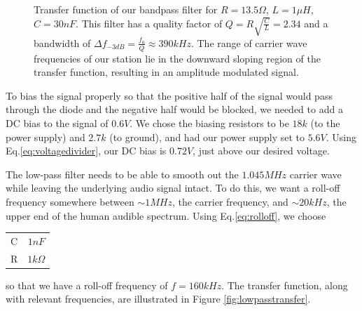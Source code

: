 \documentclass[12pt]{article}
\begin{document}
\begin{figure}[H]
\caption{Transfer function of our bandpass filter for $R =13.5\Omega$, $L=1\mu H$, $C=30nF$. This filter has a quality factor of $Q=R\sqrt{\frac{C}{L}}=2.34$ and a bandwidth of $\Delta f_{-3dB}=\frac{f_0}{Q}\approx 390kHz$. The range of carrier wave frequencies of our station lie in the downward sloping region of the transfer function, resulting in an amplitude modulated signal.}
\label{fig:bandpasstransfer}
\end{figure}

To bias the signal properly so that the positive half of the signal would pass through the diode and the negative half would be blocked, we needed to add a DC bias to the signal of $0.6V$. We chose the biasing resistors to be $18k$ (to the power supply) and $2.7k$ (to ground), and had our power supply set to $5.6V$. Using Eq.\ref{eq:voltagedivider}, our DC bias is $0.72V$, just above our desired voltage.

The low-pass filter needs to be able to smooth out the $1.045MHz$ carrier wave while leaving the underlying audio signal intact. To do this, we want a roll-off frequency somewhere between $\sim 1MHz$, the carrier frequency, and $\sim 20kHz$, the upper end of the human audible spectrum. Using Eq.\ref{eq:rolloff}, we choose

\begin{center}
  \begin{tabular}{ c  c }
    C & $1nF$ \\
    R & $1k\Omega$ 
  \end{tabular}
\end{center}
so that we have a roll-off frequency of $f=160kHz$. The transfer function, along with relevant frequencies, are illustrated in Figure \ref{fig:lowpasstransfer}.
 
\end{document}
